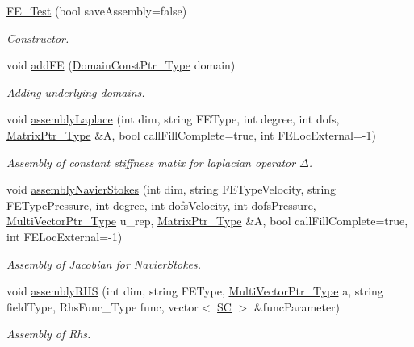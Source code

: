 \begin{DoxyCompactItemize}
\item 
\hyperlink{classFEDD_1_1FE__Test_a2e9a8640f2f6ed99376efbe84298e744}{F\+E\+\_\+\+Test} (bool save\+Assembly=false)
\begin{DoxyCompactList}\small\item\em Constructor. \end{DoxyCompactList}\item 
void \hyperlink{classFEDD_1_1FE__Test_a9703f9144722f9c01e5bde489c2e6c2f}{add\+FE} (\hyperlink{classFEDD_1_1FE__Test_a0a941851908a1e68d1554f8b28a7c72a}{Domain\+Const\+Ptr\+\_\+\+Type} domain)
\begin{DoxyCompactList}\small\item\em Adding underlying domains. \end{DoxyCompactList}\item 
void \hyperlink{classFEDD_1_1FE__Test_ab547f74307b655e75629ea6717bad2a2}{assembly\+Laplace} (int dim, string F\+E\+Type, int degree, int dofs, \hyperlink{classFEDD_1_1FE__Test_a3c2e34afc3a1495c2b00313399f12b3d}{Matrix\+Ptr\+\_\+\+Type} \&A, bool call\+Fill\+Complete=true, int F\+E\+Loc\+External=-\/1)
\begin{DoxyCompactList}\small\item\em Assembly of constant stiffness matix for laplacian operator $ \Delta $. \end{DoxyCompactList}\item 
void \hyperlink{classFEDD_1_1FE__Test_a6aeb958829d463fc3216694ac43e6873}{assembly\+Navier\+Stokes} (int dim, string F\+E\+Type\+Velocity, string F\+E\+Type\+Pressure, int degree, int dofs\+Velocity, int dofs\+Pressure, \hyperlink{classFEDD_1_1FE__Test_ac7c0363aa74e0bfcb903c13330c50185}{Multi\+Vector\+Ptr\+\_\+\+Type} u\+\_\+rep, \hyperlink{classFEDD_1_1FE__Test_a3c2e34afc3a1495c2b00313399f12b3d}{Matrix\+Ptr\+\_\+\+Type} \&A, bool call\+Fill\+Complete=true, int F\+E\+Loc\+External=-\/1)
\begin{DoxyCompactList}\small\item\em Assembly of Jacobian for Navier\+Stokes. \end{DoxyCompactList}\item 
void \hyperlink{classFEDD_1_1FE__Test_a262c614022e1bf4bf44cafb282494d15}{assembly\+R\+HS} (int dim, string F\+E\+Type, \hyperlink{classFEDD_1_1FE__Test_ac7c0363aa74e0bfcb903c13330c50185}{Multi\+Vector\+Ptr\+\_\+\+Type} a, string field\+Type, Rhs\+Func\+\_\+\+Type func, vector$<$ \hyperlink{fe__test__laplace_8cpp_a79c7e86a57edbb2a5a53242bcd04e41e}{SC} $>$ \&func\+Parameter)
\begin{DoxyCompactList}\small\item\em Assembly of Rhs. \end{DoxyCompactList}\end{DoxyCompactItemize}
